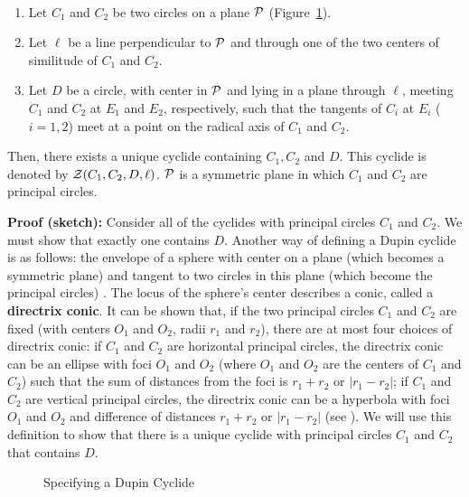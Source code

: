 \begin{lemma}
\label{lemma:non-degen-construction}\ 
\begin{enumerate}
     \item Let $C_1$ and $C_2$ be two circles on a plane ${\cal P}$
	(Figure~\ref{fig:specification-nondegen}).
     \item Let $\ell$ be a line perpendicular to ${\cal P}$ and through one of
          the two centers of similitude of $C_1$ and $C_2$.  
     \item Let $D$ be a circle, with center in ${\cal P}$ and lying in a plane
          through $\ell$, meeting $C_1$ and $C_2$ at $E_1$ and $E_2$, 
          respectively, such that the tangents of $C_i$ at $E_i$ ($i=1,2$) 
          meet at a point on the radical axis of $C_1$ and $C_2$.  
\end{enumerate}
Then, there exists a unique cyclide containing $C_1,C_2$ and $D$.  This cyclide
is denoted by ${\cal Z}(C_1,C_2,D,\ell)$.  
${\cal P}$ is a symmetric plane in which $C_1$ and $C_2$ are principal circles.
\end{lemma}
{\bf Proof (sketch):}
Consider all of the cyclides with principal circles $C_1$ and $C_2$.
We must show that exactly one contains $D$.
Another way of defining a Dupin cyclide is as follows:
the envelope of a sphere with
center on a plane (which becomes a symmetric plane) and tangent to two
circles in this plane (which become the principal circles) 
\cite{chandru-dutta-hoffmann:1989}.
The locus of the sphere's center describes a conic, called a 
{\bf directrix conic}.
It can be shown that, if the two principal circles $C_1$ and $C_2$ are fixed
(with centers $O_1$ and $O_2$, radii $r_1$ and $r_2$),
there are at most four choices of directrix conic: 
if $C_1$ and $C_2$ are horizontal principal circles, the directrix conic
can be an ellipse with foci $O_1$ and $O_2$ (where $O_1$ and $O_2$ are the
centers of $C_1$ and $C_2$) such that the sum of distances from the foci
is $r_1 + r_2$ or $|r_1 - r_2|$;
if $C_1$ and $C_2$ are vertical principal circles, the directrix conic
can be a hyperbola with foci $O_1$ and $O_2$
and difference of distances $r_1 + r_2$ or $|r_1 - r_2|$ 
(see \cite[Section~5.4.2]{shenethesis}).
We will use this definition to show that there is a unique cyclide with
principal circles $C_1$ and $C_2$ that contains $D$.

\begin{figure}
\vspace{4.5cm}
\caption{Specifying a Dupin Cyclide}
\label{fig:specification-nondegen}
\end{figure}

